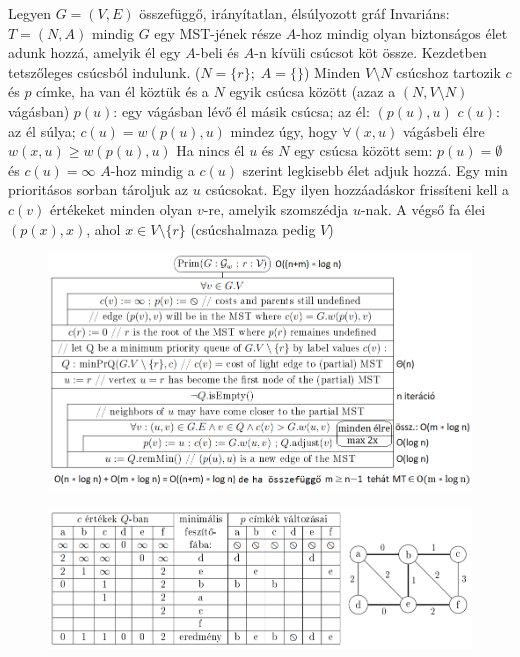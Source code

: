 \documentclass[12pt,a4paper]{article}
\begin{document}
\begin{outline}
	\1 Legyen $G=(V,E)$ összefüggő, irányítatlan, élsúlyozott gráf
	\1 Invariáns: $T=(N,A)$ mindig $G$ egy MST-jének része
	\1 $A$-hoz mindig olyan biztonságos élet adunk hozzá, amelyik él egy $A$-beli és $A$-n kívüli csúcsot köt össze.
	\1 Kezdetben tetszőleges csúcsból indulunk. ($N=\{r\}; \; A=\{\}$)
	\1 Minden $V \setminus N$ csúcshoz tartozik $c$ és $p$ címke, ha van él köztük és a $N$ egyik csúcsa között (azaz a $(N,V \setminus N)$ vágásban)
		\2 $p(u)$: egy vágásban lévő él másik csúcsa; az él: $(p(u),u)$
		\2 $c(u)$: az él súlya; $c(u)=w(p(u),u)$
		\2 mindez úgy, hogy $\forall (x,u)$ vágásbeli élre $w(x,u) \ge w(p(u),u)$
	\1 Ha nincs él $u$ és $N$ egy csúcsa között sem: $p(u)=\emptyset$ és $c(u)=\infty$
	\1 $A$-hoz mindig a $c(u)$ szerint legkisebb élet adjuk hozzá.
		\2 Egy min prioritásos sorban tároljuk az $u$ csúcsokat.
		\2 Egy ilyen hozzáadáskor frissíteni kell a $c(v)$ értékeket minden olyan $v$-re, amelyik szomszédja $u$-nak.
	\1 A végső fa élei $(p(x),x)$, ahol $x \in V \setminus \{r\}$ (csúcshalmaza pedig $V$)
\end{outline}

\pagebreak

\begin{figure}[h!]
	\centering
	\includegraphics[width=1\linewidth]{prim}
\end{figure}

\begin{figure}[h!]
	\centering
	\includegraphics[width=1\linewidth]{prim-példa}
\end{figure}
\end{document}
